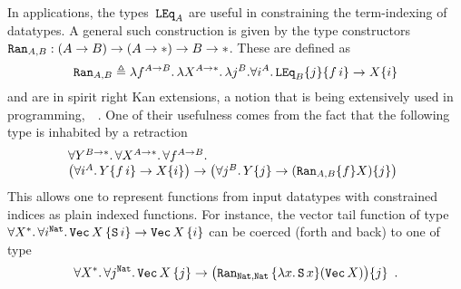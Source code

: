 In applications, the types~$\mathtt{LEq}_A$ are useful in constraining the
term-indexing of datatypes. %
A general such construction is given by the type constructors $\mathtt{Ran}_{A,B}:
(A\to B) \to (A\to*) \to B\to *$.  These are defined as 
\[
\mathtt{Ran}_{A,B}
\triangleq
\lambda f^{A\to B}.\,
  \lambda X^{A\to*}.\,
    \lambda j^B.
      \forall i^A.\,
        \mathtt{LEq}_B \{j\} \{f\,i\}
	  \to X\{i\}
\]
and are in spirit right Kan extensions, a notion that is being extensively
used in programming,~\eg~\cite{AbeMatUus05,JohannGhani08}. %
%
One of their usefulness comes from the fact that the following type
is inhabited by a retraction
\[
\!\!\!
\begin{array}{l}
\forall Y^{B\to*}.\,\forall X^{A\to*}.\,\forall f^{A\to B}.\,
\\
\big(\forall i^A.\,Y\{f\,i\}\to X\{i\}\big)
\to
\big(\forall j^B.\,Y\{j\}\to (\mathtt{Ran}_{A,B}\{f\} X)\{j\}\big)
\end{array}\]
This allows one to represent functions from input datatypes with
constrained indices as plain indexed functions.  For instance, the vector
tail function of type 
$\forall X^{*}.\,\forall i^{\mathtt{Nat}}.\,\mathtt{Vec}\, X\, \{\mathtt
S\, i\} \to \mathtt{Vec}\, X\,\{i\}$ can be coerced (forth and back) to one of
type 
\[
\forall X^{*}.\,\forall j^{\mathtt{Nat}}.\,\mathtt{Vec}\, X\, \{j\} \to
\big(\mathtt{Ran}_{\mathtt{Nat},\mathtt{Nat}}\,\{\lambda x.\,\mathtt S\,
x\}(\mathtt{Vec}\, X)\big)\{j\}
\enspace.
\]

